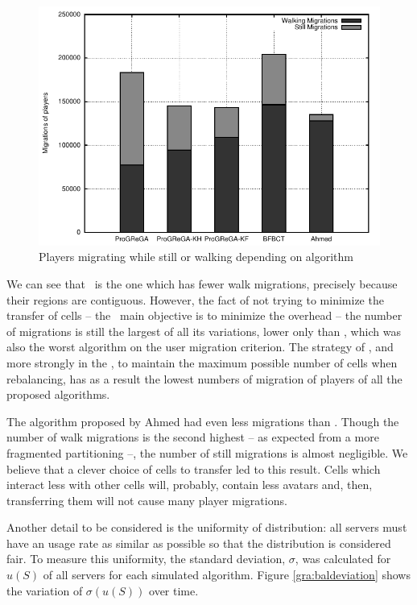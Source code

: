 \begin{figure}[!t]
  \centering
  \includegraphics[width=0.9\linewidth]{images/balmigxtb_ah}
  \caption{Players migrating while still or walking depending on algorithm}
  \label{gra:balmigxtb}
\end{figure}

	
We can see that \ggp\ is the one which has fewer walk migrations, precisely because their regions are contiguous. However, the fact of not trying to minimize the transfer of cells -- the \ggp\ main objective is to minimize the overhead -- the number of migrations is still the largest of all its variations, lower only than \bfa, which was also the worst algorithm on the user migration criterion. The strategy of \ggpk, and more strongly in the \ggpf, to maintain the maximum possible number of cells when rebalancing, has as a result the lowest numbers of migration of players of all the proposed algorithms.

The algorithm proposed by Ahmed had even less migrations than \ggpf. Though the number of walk migrations is the second highest -- as expected from a more fragmented partitioning --, the number of still migrations is almost negligible. We believe that a clever choice of cells to transfer led to this result. Cells which interact less with other cells will, probably, contain less avatars and, then, transferring them will not cause many player migrations.

Another detail to be considered is the uniformity of distribution: all servers must have an usage rate as similar as possible so that the distribution is considered fair. To measure this uniformity, the standard deviation, $\sigma$, was calculated for $u(S)$ of all servers for each simulated algorithm. Figure \ref{gra:baldeviation} shows the variation of $\sigma{}(u(S))$ over time.

